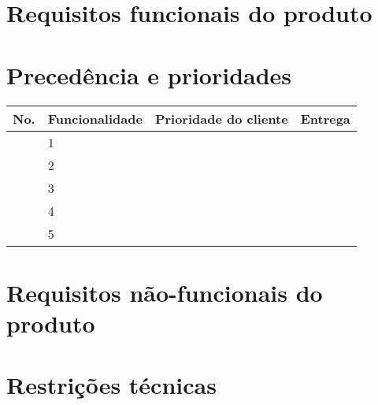 \documentclass[12pt, a4paper]{article}
\begin{document}
    \section{Requisitos funcionais do produto}

    \section{Precedência e prioridades}
            \begin{tabular}{ p{3.75cm} | p{3.75cm} | p{3.75cm} | p{3.75cm} }
                \hline
                \textbf{No.} &
                \textbf{Funcionalidade} &
                \textbf{Prioridade do cliente} &
                \textbf{Entrega} \\ \hline
                & 1 & & \\ \hline
                & 2 & & \\ \hline
                & 3 & & \\ \hline
                & 4 & & \\ \hline
                & 5 & & \\ \hline
            \end{tabular}

    \section{Requisitos não-funcionais do produto}

    \section{Restrições técnicas}
\end{document}
